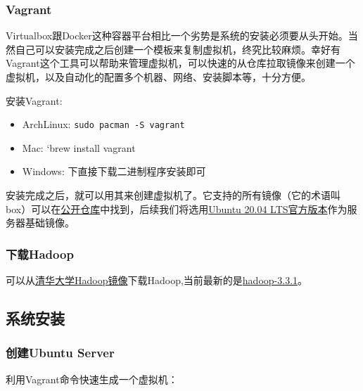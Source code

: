 \documentclass[12pt]{article}
\begin{document}
\subsubsection{Vagrant}\label{vagrant}

Virtualbox跟Docker这种容器平台相比一个劣势是系统的安装必须要从头开始。当然自己可以安装完成之后创建一个模板来复制虚拟机，终究比较麻烦。幸好有Vagrant这个工具可以帮助来管理虚拟机，可以快速的从仓库拉取镜像来创建一个虚拟机，以及自动化的配置多个机器、网络、安装脚本等，十分方便。

安装Vagrant:

\begin{itemize}
\tightlist
\item
  ArchLinux: \texttt{sudo\ pacman\ -S\ vagrant}
\item
  Mac: `brew install vagrant
\item
  Windows: 下直接下载二进制程序安装即可
\end{itemize}

安装完成之后，就可以用其来创建虚拟机了。它支持的所有镜像（它的术语叫box）可以在\href{https://app.vagrantup.com}{公开仓库}中找到，后续我们将选用\href{https://app.vagrantup.com/ubuntu/boxes/focal64}{Ubuntu 20.04 LTS官方版本}作为服务器基础镜像。

\subsubsection{下载Hadoop}\label{ux4e0bux8f7dhadoop}

可以从\href{https://mirrors.tuna.tsinghua.edu.cn/apache/hadoop}{清华大学Hadoop镜像}下载Hadoop,当前最新的是\href{https://mirrors.tuna.tsinghua.edu.cn/apache/hadoop/common/hadoop-3.3.1/hadoop-3.3.1.tar.gz}{hadoop-3.3.1}。

\subsection{系统安装}\label{ux7cfbux7edfux5b89ux88c5}

\subsubsection{创建Ubuntu Server}\label{ux521bux5efaubuntu-server}

利用Vagrant命令快速生成一个虚拟机：

\begin{Shaded}
\begin{Highlighting}[]
\end{Highlighting}
\end{Shaded}
\end{document}
